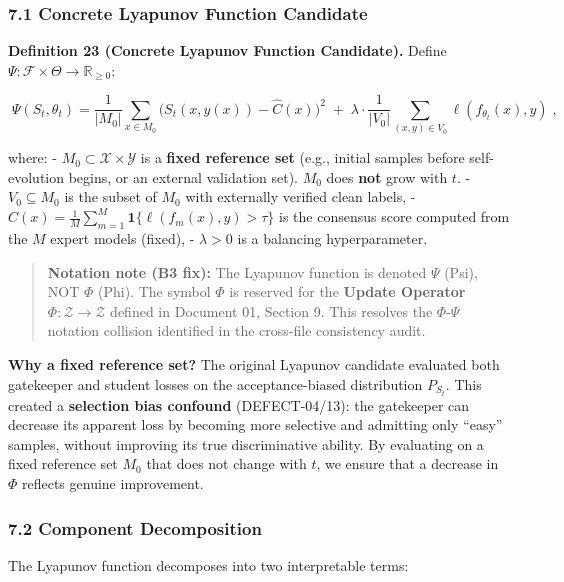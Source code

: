 \documentclass[
  12pt,
]{article}
\begin{document}
\subsubsection{7.1 Concrete Lyapunov Function
Candidate}\label{concrete-lyapunov-function-candidate}

\textbf{Definition 23 (Concrete Lyapunov Function Candidate).} Define
\(\Psi: \mathcal{F} \times \Theta \to \mathbb{R}_{\geq 0}\):

\[\boxed{\;\Psi(S_t, \theta_t) = \frac{1}{|M_0|} \sum_{x \in M_0} \bigl(S_t(x, y(x)) - \hat{C}(x)\bigr)^2 \;+\; \lambda \cdot \frac{1}{|V_0|} \sum_{(x,y) \in V_0} \ell(f_{\theta_t}(x), y)\;},\]

where: - \(M_0 \subset \mathcal{X} \times \mathcal{Y}\) is a
\textbf{fixed reference set} (e.g., initial samples before
self-evolution begins, or an external validation set). \(M_0\) does
\textbf{not} grow with \(t\). - \(V_0 \subseteq M_0\) is the subset of
\(M_0\) with externally verified clean labels, -
\(\hat{C}(x) = \frac{1}{M}\sum_{m=1}^M \mathbf{1}\{\ell(f_m(x), y) > \tau\}\)
is the consensus score computed from the \(M\) expert models (fixed), -
\(\lambda > 0\) is a balancing hyperparameter.

\begin{quote}
\textbf{Notation note (B3 fix):} The Lyapunov function is denoted
\(\Psi\) (Psi), NOT \(\Phi\) (Phi). The symbol \(\Phi\) is reserved for
the \textbf{Update Operator} \(\Phi: \mathcal{Z} \to \mathcal{Z}\)
defined in Document 01, Section 9. This resolves the \(\Phi\)-\(\Psi\)
notation collision identified in the cross-file consistency audit.
\end{quote}

\textbf{Why a fixed reference set?} The original Lyapunov candidate
evaluated both gatekeeper and student losses on the acceptance-biased
distribution \(P_{S_t}\). This created a \textbf{selection bias
confound} (DEFECT-04/13): the gatekeeper can decrease its apparent loss
by becoming more selective and admitting only ``easy'' samples, without
improving its true discriminative ability. By evaluating on a fixed
reference set \(M_0\) that does not change with \(t\), we ensure that a
decrease in \(\Phi\) reflects genuine improvement.

\subsubsection{7.2 Component
Decomposition}\label{component-decomposition}

The Lyapunov function decomposes into two interpretable terms:
\end{document}
